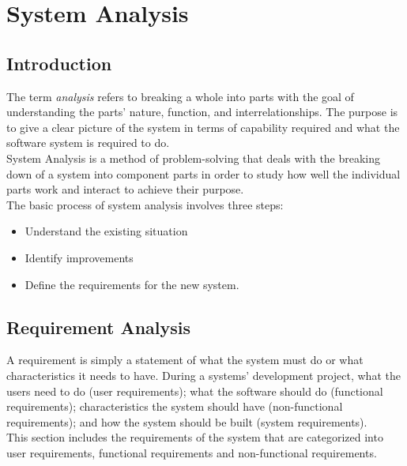 \documentclass[twoside, a4paper, 12pt]{report}
\begin{document}
\chapter{System Analysis}
\section{Introduction}
The term \textit{analysis} refers to breaking a whole into parts with the goal of understanding the parts' nature, function, and interrelationships. The purpose is to give a clear picture of the system in terms of capability required and what the software system is required to do. \autocite{dennis2009systems}\\
\indent
System Analysis is a method of problem-solving that deals with the breaking down of a system into component parts in order to study how well the individual parts work and interact to achieve their purpose.\\
\indent
The basic process of system analysis involves three steps:
\begin{itemize}
	\item Understand the existing situation
	\item Identify improvements
	\item Define the requirements for the new system.
\end{itemize}

\section{Requirement Analysis}
A requirement is simply a statement of what the system must do or what characteristics it needs to have. During a systems' development project, what the users need to do (user requirements); what the software should do (functional requirements); characteristics the system should have (non-functional requirements); and how the system should be built (system requirements).\\
\indent
This section includes the requirements of the system that are categorized into user requirements, functional requirements and non-functional requirements.
\end{document}
